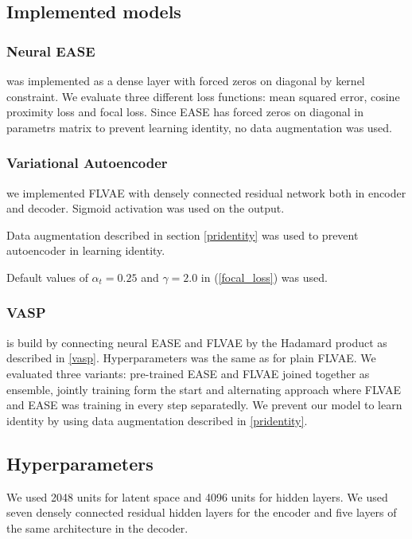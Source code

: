 \documentclass[conference]{IEEEtran}
\begin{document}
 
    \subsection{Implemented models}
        
\subsubsection{Neural EASE} was implemented as a dense layer with forced zeros on diagonal by kernel constraint. We evaluate three different loss functions: mean squared error, cosine proximity loss and focal loss. Since EASE has forced zeros on diagonal in parametrs matrix to prevent learning identity, no data augmentation was used.
    
        \subsubsection{Variational Autoencoder} we implemented FLVAE  with densely connected residual network both in encoder and decoder. Sigmoid activation was used on the output. 
        


        Data augmentation described in section \ref{pridentity} was used to prevent autoencoder in learning identity.  
        
        Default values of \(\alpha_t=0.25\) and  \(\gamma=2.0\) in (\ref{focal_loss}) was used.
        
        \subsubsection{VASP} is build by connecting neural EASE and FLVAE by the Hadamard product as described in \ref{vasp}. Hyperparameters was the same as for plain FLVAE.
        We evaluated three variants: pre-trained EASE and FLVAE joined together as ensemble, jointly training form the start and alternating approach where FLVAE and EASE was training in every step separatedly. We prevent our model to learn identity by using data augmentation described in \ref{pridentity}.
        
        \subsection{Hyperparameters}
        We used 2048 units for latent space and 4096 units for hidden layers. We used seven densely connected residual hidden layers for the encoder and five layers of the same architecture in the decoder.
        
\end{document}
